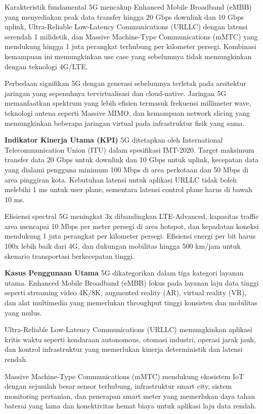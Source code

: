 Karakteristik fundamental 5G mencakup Enhanced Mobile Broadband (eMBB) yang menyediakan peak data transfer hingga 20 Gbps downlink dan 10 Gbps uplink, Ultra-Reliable Low-Latency Communications (URLLC) dengan latensi serendah 1 milidetik, dan Massive Machine-Type Communications (mMTC) yang mendukung hingga 1 juta perangkat terhubung per kilometer persegi. Kombinasi kemampuan ini memungkinkan use case  yang sebelumnya tidak memungkinkan dengan teknologi 4G/LTE.

Perbedaan signifikan 5G dengan generasi sebelumnya terletak pada arsitektur jaringan yang sepenuhnya tervirtualisasi dan cloud-native. Jaringan 5G memanfaatkan spektrum yang lebih efisien termasuk frekuensi millimeter wave, teknologi antena seperti Massive MIMO, dan kemampuan network slicing yang memungkinkan beberapa jaringan virtual pada infrastruktur fisik yang sama.

\textbf{Indikator Kinerja Utama (KPI)} 5G ditetapkan oleh International Telecommunication Union (ITU) dalam spesifikasi IMT-2020. Target maksimum transfer data 20 Gbps untuk downlink dan 10 Gbps untuk uplink, kecepatan data yang dialami pengguna minimum 100 Mbps di area perkotaan dan 50 Mbps di area pinggiran kota. Kebutuhan latensi untuk aplikasi URLLC tidak boleh melebihi 1 ms untuk user plane, sementara latensi control plane harus di bawah 10 ms.

Efisiensi spectral 5G meningkat 3x dibandingkan LTE-Advanced, kapasitas traffic area mencapai 10 Mbps per meter persegi di area hotspot, dan kepadatan koneksi mendukung 1 juta perangkat per kilometer persegi. Efisiensi energi per bit harus 100x lebih baik dari 4G, dan dukungan mobilitas hingga 500 km/jam untuk skenario transportasi berkecepatan tinggi.

\textbf{Kasus Penggunaan Utama} 5G dikategorikan dalam tiga kategori layanan utama. Enhanced Mobile Broadband (eMBB) fokus pada layanan laju data tinggi seperti streaming video 4K/8K, augmented reality (AR), virtual reality (VR), dan alat multimedia yang memerlukan throughput tinggi konsisten dan mobilitas yang mulus.

Ultra-Reliable Low-Latency Communications (URLLC) memungkinkan aplikasi kritis waktu seperti kendaraan autonomous, otomasi industri, operasi jarak jauh, dan kontrol infrastruktur yang memerlukan kinerja deterministik dan latensi rendah.

Massive Machine-Type Communications (mMTC) mendukung ekosistem IoT dengan sejumlah besar sensor terhubung, infrastruktur smart city, sistem monitoring pertanian, dan penerapan smart meter yang memerlukan daya tahan baterai yang lama dan konektivitas hemat biaya untuk aplikasi laju data rendah.


